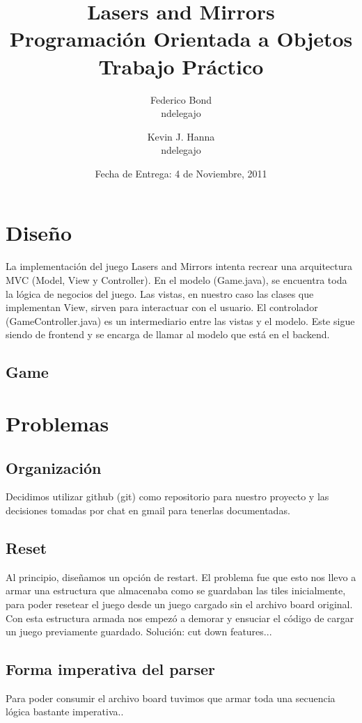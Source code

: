 \documentclass[a4paper, 11pt]{article}
\title{\Huge {Lasers and Mirrors} \\ Programación Orientada a Objetos\\[0.7cm] Trabajo Práctico}
\author{Federico Bond\\ndelegajo \and Kevin J. Hanna\\ndelegajo}
\date{Fecha de Entrega: 4 de Noviembre, 2011}
\begin{document}
 


\maketitle
\begin{abstract}

\end{abstract}


\newpage
\tableofcontents
\clearpage 


\section{Diseño}
La implementación del juego Lasers and Mirrors intenta recrear una arquitectura MVC (Model, View y Controller). En el modelo (Game.java), se encuentra toda la lógica de negocios del juego. Las vistas, en nuestro caso las clases que implementan View, sirven para interactuar con el usuario. El controlador (GameController.java) es un intermediario entre las vistas y el modelo. Este sigue siendo de frontend y se encarga de llamar al modelo que está en el backend.
	\subsection{Game}
		

\section{Problemas}
	\subsection{Organización}
		Decidimos utilizar github (git) como repositorio para nuestro proyecto y las decisiones tomadas por chat en gmail para tenerlas documentadas.
		
	\subsection{Reset}
		Al principio, diseñamos un opción de restart. El problema fue que esto nos llevo a armar una estructura que almacenaba como se guardaban las tiles inicialmente, para poder resetear el juego desde un juego cargado sin el archivo board original. Con esta estructura armada nos empezó a demorar y ensuciar el código de cargar un juego previamente guardado. Solución: cut down features...
		
	\subsection{Forma imperativa del parser}
		Para poder consumir el archivo board tuvimos que armar toda una secuencia lógica bastante imperativa..
\end{document}
